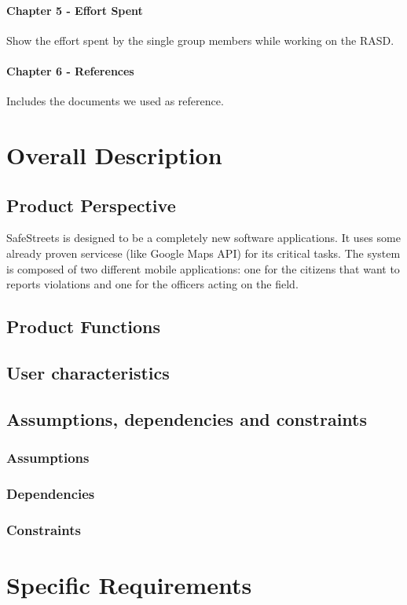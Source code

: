 \documentclass{article}
\begin{document}
\paragraph{Chapter 5 - Effort Spent}
Show the effort spent by the single group members while working on the RASD.
\paragraph{Chapter 6 - References}
Includes the documents we used as reference.
\newpage
\section{Overall Description}
\subsection{Product Perspective}
SafeStreets is designed to be a completely new software applications. It uses some already proven servicese (like Google Maps API) for its critical tasks.
The system is composed of two different mobile applications: one for the citizens that want to reports violations and one for the officers acting on the field.

\subsection{Product Functions}
\subsection{User characteristics}
\subsection{Assumptions, dependencies and constraints}
\subsubsection{Assumptions}
\subsubsection{Dependencies}
\subsubsection{Constraints}

\newpage
\section{Specific Requirements}
\end{document}
